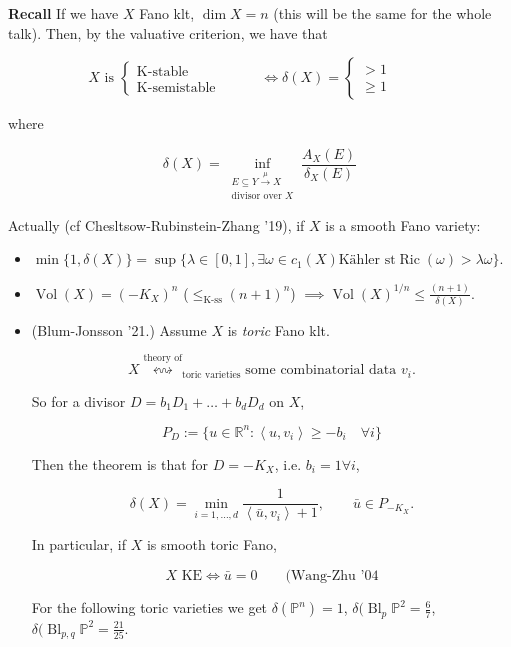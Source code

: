 \textbf{Recall} If we have $X$ Fano klt,
$\dim X=n$ (this will be the same for the
whole talk). Then, by the valuative
criterion, we have that

$$
X \text{ is }\begin{cases}
\text{K-stable} \qquad & \\
\text{K-semistable} \qquad &
\end{cases}\iff \delta(X)=\begin{cases}
>1\qquad & \\
\geq 1\qquad &
\end{cases}
$$

where

$$
\delta(X)=\operatorname{inf}_{\substack{E
\subseteq Y \xrightarrow{\mu}X \\
\text{divisor over $X$}
}}\frac{A_X(E)}{\delta_X(E)}
$$

Actually (cf Chesltsow-Rubinstein-Zhang '19),
if $X$ is a smooth Fano variety:
\begin{itemize}
\item
$\operatorname{min}\{1,\delta(X)\}=
\operatorname{sup}\{\lambda
\in [0,1], \exists \omega \in
c_1(X)\text{K\"ahler st}
\operatorname{Ric}(\omega) > \lambda
\omega\}$.
\item $\operatorname{Vol}(X)=(-K_X)^n$
($\leq_{\text{K-ss} }(n+1)^n$) $\implies
\operatorname{Vol}(X)^{1/n}\leq
\frac{(n+1)}{\delta(X)}$.
\item (Blum-Jonsson '21.) Assume $X$ is
\textit{toric} Fano klt.

$$
X \overset{\text{theory of} }{
\leftrightsquigarrow}_{\text{toric varieties}
}\text{some combinatorial data $v_i$}.
$$

So for a divisor $D=b_1D_1+\ldots+b_dD_d$ on
$X$,

$$
P_D:=\{u \in \mathbb{R}^n: \left\langle{}
u,v_i \right\rangle{}\geq -b_i \quad \forall
i\}
$$

Then the theorem is that for $D=-K_X$, i.e.
$b_i=1 \forall i$,

$$
\delta(X)=\operatorname{min}_{i=1,\ldots,d}
\frac{1}{\left\langle{}
\bar{u},v_i \right\rangle{}+1},\qquad \bar{u}
\in P_{-K_X}.
$$

In particular, if $X$ is smooth toric Fano,

$$
X \text{ KE} \iff \bar{u} =0\qquad
\text{(Wang-Zhu '04}
$$

\begin{example}
\label{example-montero-3}
For the following toric varieties we get
$\delta(\mathbb{P}^n)=1$,
$\delta(\operatorname{Bl}_p\mathbb{P}^2=
\frac{6}{7}$,
$\delta(\operatorname{Bl}_{p,q}\mathbb{P}^2=
\frac{21}{25}$.
\end{example}
\end{itemize}

